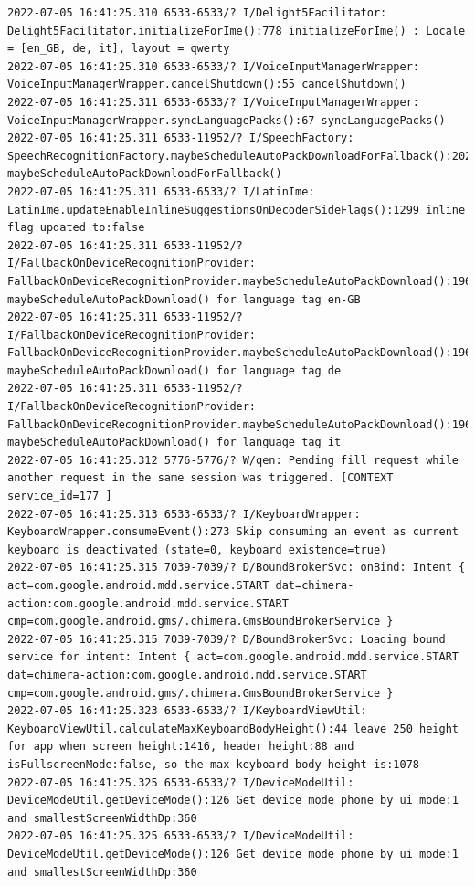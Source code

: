\documentclass[a4paper,12pt]{book}
\begin{document}
\begin{lstlisting}
2022-07-05 16:41:25.310 6533-6533/? I/Delight5Facilitator: Delight5Facilitator.initializeForIme():778 initializeForIme() : Locale = [en_GB, de, it], layout = qwerty
2022-07-05 16:41:25.310 6533-6533/? I/VoiceInputManagerWrapper: VoiceInputManagerWrapper.cancelShutdown():55 cancelShutdown()
2022-07-05 16:41:25.311 6533-6533/? I/VoiceInputManagerWrapper: VoiceInputManagerWrapper.syncLanguagePacks():67 syncLanguagePacks()
2022-07-05 16:41:25.311 6533-11952/? I/SpeechFactory: SpeechRecognitionFactory.maybeScheduleAutoPackDownloadForFallback():202 maybeScheduleAutoPackDownloadForFallback()
2022-07-05 16:41:25.311 6533-6533/? I/LatinIme: LatinIme.updateEnableInlineSuggestionsOnDecoderSideFlags():1299 inline flag updated to:false
2022-07-05 16:41:25.311 6533-11952/? I/FallbackOnDeviceRecognitionProvider: FallbackOnDeviceRecognitionProvider.maybeScheduleAutoPackDownload():196 maybeScheduleAutoPackDownload() for language tag en-GB
2022-07-05 16:41:25.311 6533-11952/? I/FallbackOnDeviceRecognitionProvider: FallbackOnDeviceRecognitionProvider.maybeScheduleAutoPackDownload():196 maybeScheduleAutoPackDownload() for language tag de
2022-07-05 16:41:25.311 6533-11952/? I/FallbackOnDeviceRecognitionProvider: FallbackOnDeviceRecognitionProvider.maybeScheduleAutoPackDownload():196 maybeScheduleAutoPackDownload() for language tag it
2022-07-05 16:41:25.312 5776-5776/? W/qen: Pending fill request while another request in the same session was triggered. [CONTEXT service_id=177 ]
2022-07-05 16:41:25.313 6533-6533/? I/KeyboardWrapper: KeyboardWrapper.consumeEvent():273 Skip consuming an event as current keyboard is deactivated (state=0, keyboard existence=true)
2022-07-05 16:41:25.315 7039-7039/? D/BoundBrokerSvc: onBind: Intent { act=com.google.android.mdd.service.START dat=chimera-action:com.google.android.mdd.service.START cmp=com.google.android.gms/.chimera.GmsBoundBrokerService }
2022-07-05 16:41:25.315 7039-7039/? D/BoundBrokerSvc: Loading bound service for intent: Intent { act=com.google.android.mdd.service.START dat=chimera-action:com.google.android.mdd.service.START cmp=com.google.android.gms/.chimera.GmsBoundBrokerService }
2022-07-05 16:41:25.323 6533-6533/? I/KeyboardViewUtil: KeyboardViewUtil.calculateMaxKeyboardBodyHeight():44 leave 250 height for app when screen height:1416, header height:88 and isFullscreenMode:false, so the max keyboard body height is:1078
2022-07-05 16:41:25.325 6533-6533/? I/DeviceModeUtil: DeviceModeUtil.getDeviceMode():126 Get device mode phone by ui mode:1 and smallestScreenWidthDp:360
2022-07-05 16:41:25.325 6533-6533/? I/DeviceModeUtil: DeviceModeUtil.getDeviceMode():126 Get device mode phone by ui mode:1 and smallestScreenWidthDp:360

\end{lstlisting}
\end{document}
